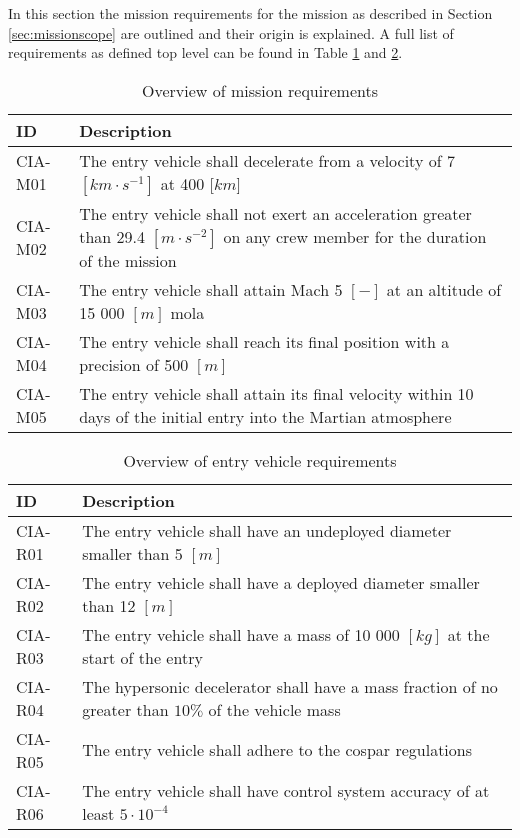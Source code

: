 In this section the mission requirements for the mission as described in Section \ref{sec:missionscope} are outlined and their origin is explained. A full list of requirements as defined top level can be found in Table \ref{tab:misreq} and \ref{tab:vehreq}.

\begin{table}[h]
	\caption{Overview of mission requirements}
	\label{tab:misreq} 
	\begin{tabular}{|p{}|p{}|}

    \hline
    \textbf{ID}          & \textbf{Description}                                                                                                      \\ \hline \hline
    CIA-M01& The entry vehicle shall decelerate from a velocity of 7 $[km\cdot s ^{-1}]$ at 400 [$km$]  \\ \hline
    CIA-M02 & The entry vehicle shall not exert an acceleration greater than 29.4 $[m \cdot s^{-2}]$ on any crew member for the duration of the mission			\\ \hline
    	CIA-M03 & The entry vehicle shall attain Mach 5 $[-]$ at an altitude of 15 000 $[m]$  \gls{mola} \\ \hline
    	CIA-M04 & The entry vehicle shall reach its final position with a precision of 500 $[m]$\\ \hline
    	CIA-M05 & The entry vehicle shall attain its final velocity within 10 days of the initial entry into the Martian atmosphere \\ \hline
    \end{tabular}

\end{table}

\begin{table}[h]
	\caption{Overview of entry vehicle requirements} 
	\label{tab:vehreq}
	\begin{tabular}{|p{}|p{}|}
		\hline
		\textbf{ID}          & \textbf{Description}                                                                                                     \\ \hline \hline
		CIA-R01 & The entry vehicle shall have an undeployed diameter smaller than 5 $[m]$                         				            \\ \hline
		CIA-R02 & The entry vehicle shall have a deployed diameter smaller than 12 $[m]$                         				            \\ \hline	
		CIA-R03 & The entry vehicle shall have a mass of 10 000 $[kg]$ at the start of the entry                       				            \\ \hline
		CIA-R04 & The hypersonic decelerator shall have a mass fraction of no greater than $10\%$ of the vehicle mass  \\ \hline
		CIA-R05 &  The entry vehicle shall adhere to the \gls{cospar} regulations \\ \hline
		CIA-R06 &  The entry vehicle shall have control system accuracy of at least $5\cdot 10^{-4}$  \\ \hline
	\end{tabular}
\end{table}

